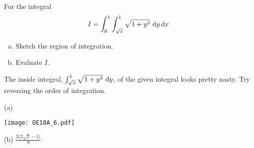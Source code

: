 \begin{question}[M200 2010A] %
For the integral
\begin{equation*}
I = \int_0^1 \int_{\sqrt{x}}^1 \sqrt{1+y^3}\ \mathrm{d}y\,\mathrm{d}x
\end{equation*}
\begin{enumerate}[(a)]
\item
Sketch the region of integration.
\item
Evaluate $I$.
\end{enumerate}
\end{question}

\begin{hint}
The inside integral, $\int_{\sqrt{x}}^1 \sqrt{1+y^3}\ \mathrm{d}y$,
of the given integral looks pretty nasty. Try reversing the order of 
integration.
\end{hint}

\begin{answer}
(a)
\begin{center}
     \texttt{[image: OE10A\_6.pdf]}
\end{center}

(b) $\frac{2\big(2\sqrt{2}-1\big)}{9}$
\end{answer}

